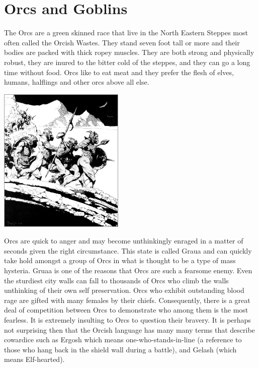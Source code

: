 \documentclass[a4paper]{dnd5}
\begin{document}
\pagestyle{empty}

\newtoggle{DM}
\toggletrue{DM}

\section*{Orcs and Goblins}

The Orcs are a green skinned race that live in the North Eastern Steppes most often called the Orcish Wastes.  They stand seven foot tall or more and their bodies are packed with thick ropey muscles.  They are both strong and physically robust, they are inured to the bitter cold of the steppes, and they can go a long time without food.  Orcs like to eat meat and they prefer the flesh of elves, humans, halflings and other orcs above all else.  

\vspace{0.4em}
\includegraphics[width=0.45\textwidth]{orcs.jpg}
\vspace{0.4em}

Orcs are quick to anger and may become unthinkingly enraged in a matter of seconds given the right circumstance.  This state is called Graua and can quickly take hold amongst a group of Orcs in what is thought to be a type of mass hysteria.  Gruaa is one of the reasons that Orcs are such a fearsome enemy.  Even the sturdiest city walls can fall to thousands of Orcs who climb the walls unthinking of their own self preservation.  Orcs who exhibit outstanding blood rage are gifted with many females by their chiefs.   Consequently, there is a great deal of competition between Orcs to demonstrate who among them is the most fearless.  It is extremely insulting to Orcs to question their bravery.  It is perhaps not surprising then that the Orcish language has many many terms that describe cowardice such as Ergosh which means one-who-stands-in-line (a reference to those who hang back in the shield wall during a battle), and Gelash (which means Elf-hearted).
\end{document}

